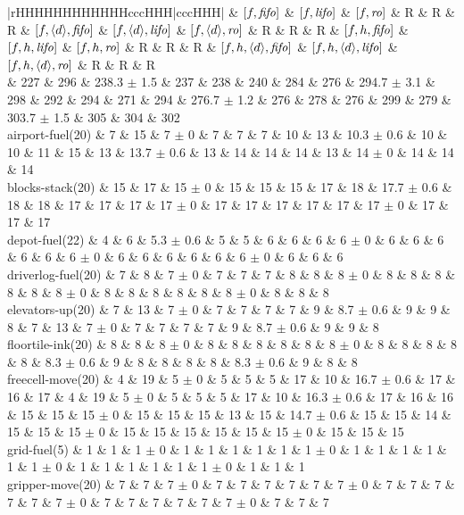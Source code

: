 \begin{center}
\begin{tabular}{|rHHHHHHHHHHHHcccHHH|cccHHH|}
 & \([f,{\text{\textit{fifo}}}]\) & \([f,{\text{\textit{lifo}}}]\) & \([f,{\text{\textit{ro}}}]\) & R & R & R & \([f,{\left<d\right>},{\text{\textit{fifo}}}]\) & \([f,{\left<d\right>},{\text{\textit{lifo}}}]\) & \([f,{\left<d\right>},{\text{\textit{ro}}}]\) & R & R & R & \([f,h,{\text{\textit{fifo}}}]\) & \([f,h,{\text{\textit{lifo}}}]\) & \([f,h,{\text{\textit{ro}}}]\) & R & R & R & \([f,h,{\left<d\right>},{\text{\textit{fifo}}}]\) & \([f,h,{\left<d\right>},{\text{\textit{lifo}}}]\) & \([f,h,{\left<d\right>},{\text{\textit{ro}}}]\) & R & R & R\\
\hline
 & 227 & 296 & 238.3 \(\pm\) 1.5 & 237 & 238 & 240 & 284 & 276 & 294.7 \(\pm\) 3.1 & 298 & 292 & 294 & 271 & 294 & 276.7 \(\pm\) 1.2 & 276 & 278 & 276 & 299 & 279 & 303.7 \(\pm\) 1.5 & 305 & 304 & 302\\
\hline
airport-fuel(20) & 7 & 15 & 7 \(\pm\) 0 & 7 & 7 & 7 & 10 & 13 & 10.3 \(\pm\) 0.6 & 10 & 10 & 11 & 15 & 13 & 13.7 \(\pm\) 0.6 & 13 & 14 & 14 & 14 & 13 & 14 \(\pm\) 0 & 14 & 14 & 14\\
blocks-stack(20) & 15 & 17 & 15 \(\pm\) 0 & 15 & 15 & 15 & 17 & 18 & 17.7 \(\pm\) 0.6 & 18 & 18 & 17 & 17 & 17 & 17 \(\pm\) 0 & 17 & 17 & 17 & 17 & 17 & 17 \(\pm\) 0 & 17 & 17 & 17\\
depot-fuel(22) & 4 & 6 & 5.3 \(\pm\) 0.6 & 5 & 5 & 6 & 6 & 6 & 6 \(\pm\) 0 & 6 & 6 & 6 & 6 & 6 & 6 \(\pm\) 0 & 6 & 6 & 6 & 6 & 6 & 6 \(\pm\) 0 & 6 & 6 & 6\\
driverlog-fuel(20) & 7 & 8 & 7 \(\pm\) 0 & 7 & 7 & 7 & 8 & 8 & 8 \(\pm\) 0 & 8 & 8 & 8 & 8 & 8 & 8 \(\pm\) 0 & 8 & 8 & 8 & 8 & 8 & 8 \(\pm\) 0 & 8 & 8 & 8\\
elevators-up(20) & 7 & 13 & 7 \(\pm\) 0 & 7 & 7 & 7 & 7 & 9 & 8.7 \(\pm\) 0.6 & 9 & 9 & 8 & 7 & 13 & 7 \(\pm\) 0 & 7 & 7 & 7 & 7 & 9 & 8.7 \(\pm\) 0.6 & 9 & 9 & 8\\
floortile-ink(20) & 8 & 8 & 8 \(\pm\) 0 & 8 & 8 & 8 & 8 & 8 & 8 \(\pm\) 0 & 8 & 8 & 8 & 8 & 8 & 8.3 \(\pm\) 0.6 & 9 & 8 & 8 & 8 & 8 & 8.3 \(\pm\) 0.6 & 9 & 8 & 8\\
freecell-move(20) & 4 & 19 & 5 \(\pm\) 0 & 5 & 5 & 5 & 17 & 10 & 16.7 \(\pm\) 0.6 & 17 & 16 & 17 & 4 & 19 & 5 \(\pm\) 0 & 5 & 5 & 5 & 17 & 10 & 16.3 \(\pm\) 0.6 & 17 & 16 & 16\\
 & 15 & 15 & 15 \(\pm\) 0 & 15 & 15 & 15 & 13 & 15 & 14.7 \(\pm\) 0.6 & 15 & 15 & 14 & 15 & 15 & 15 \(\pm\) 0 & 15 & 15 & 15 & 15 & 15 & 15 \(\pm\) 0 & 15 & 15 & 15\\
grid-fuel(5) & 1 & 1 & 1 \(\pm\) 0 & 1 & 1 & 1 & 1 & 1 & 1 \(\pm\) 0 & 1 & 1 & 1 & 1 & 1 & 1 \(\pm\) 0 & 1 & 1 & 1 & 1 & 1 & 1 \(\pm\) 0 & 1 & 1 & 1\\
gripper-move(20) & 7 & 7 & 7 \(\pm\) 0 & 7 & 7 & 7 & 7 & 7 & 7 \(\pm\) 0 & 7 & 7 & 7 & 7 & 7 & 7 \(\pm\) 0 & 7 & 7 & 7 & 7 & 7 & 7 \(\pm\) 0 & 7 & 7 & 7\\

\end{tabular}
\end{center}
